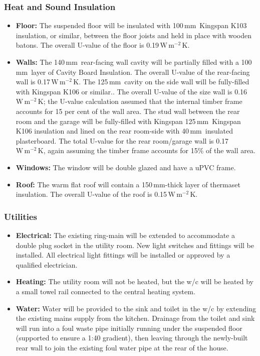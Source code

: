 \documentclass{extension}
\newcommand{\mm}{\,$\mathrm{mm}$}
\newcommand{\uunit}{\,$\mathrm{W\,m^{-2}\,K}$}
\begin{document}
\subsubsection{Heat and Sound Insulation}
\begin{itemize}
  \item {\bf Floor:} The suspended floor will be insulated with 100\mm\ Kingspan K103 insulation, or similar, between the floor joists and held in place with wooden batons. The overall U-value of the floor is 0.19\uunit .
  \item {\bf Walls:} The 140\mm\ rear-facing wall cavity will be partially filled with a 100\mm\ layer of Cavity Board Insulation.\cite{uw1ins} The overall U-value of the rear-facing wall is 0.17\uunit . The 125\mm\ cavity on the side wall will be fully-filled with Kingspan K106 or similar.\cite{uw2ins}. The overall U-value of the size wall is 0.16\uunit ; the U-value calculation assumed that the internal timber frame accounts for 15 per cent of the wall area. The stud wall between the rear room and the garage will be fully-filled with Kingspan 125\mm\ Kingspan K106\cite{uw2ins} insulation and lined on the rear room-side with 40\mm\ insulated plasterboard.\cite{uw3ins} The total U-value for the rear room/garage wall is 0.17\uunit , again assuming the timber frame accounts for 15\% of the wall area.
  \item {\bf Windows:} The window will be double glazed and have a uPVC frame.
  \item {\bf Roof:} The warm flat roof will contain a 150\mm -thick layer of thermaset insulation.\cite{erins} The overall U-value of the roof is 0.15\uunit .
\end{itemize}

\subsubsection{Utilities}
\begin{itemize}
  \item {\bf Electrical:} The existing ring-main will be extended to accommodate a double plug socket in the utility room. New light switches and fittings will be installed. All electrical light fittings will be installed or approved by a qualified electrician.
  \item {\bf Heating:} The utility room will not be heated, but the w/c will be heated by a small towel rail connected to the central heating system.
  \item {\bf Water:} Water will be provided to the sink and toilet in the w/c by extending the existing mains supply from the kitchen. Drainage from the toilet and sink will run into a foul waste pipe initially running under the suspended floor (supported to ensure a 1:40 gradient), then leaving through the newly-built rear wall to join the existing foul water pipe at the rear of the house.
\end{itemize}
\end{document}
